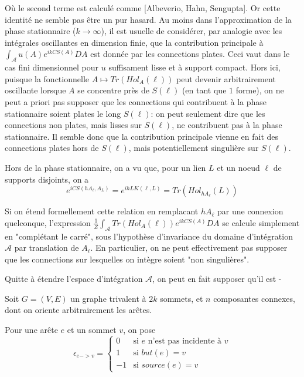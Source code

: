 \documentclass[10pt]{article}
\begin{document}
Où le second terme est calculé comme [Albeverio, Hahn, Sengupta]. Or cette identité ne semble pas être un pur hasard. Au moins dans l'approximation de la phase stationnaire ($k\to \infty$), il est usuelle de considérer, par analogie avec les intégrales oscillantes en dimension finie,  que la contribution principale à $\int_{\mathcal{A}} u(A) e^{i k CS(A)} DA $ est donnée par les connections plates. Ceci vaut dans le cas fini dimensionnel pour $u$ suffisament lisse et à support compact. Hors ici, puisque la fonctionnelle $A\mapsto Tr(Hol_A(\ell))$ peut devenir arbitrairement oscillante lorsque $A$ se concentre près de $S(\ell)$ (en tant que $1$ forme), on ne peut a priori pas supposer que les connections qui contribuent à la phase stationnaire soient plates le long $S(\ell)$: on peut seulement dire que les connections non plates, mais lisses sur $S(\ell)$, ne contribuent pas à la phase stationnaire. Il semble donc que la contribution principale vienne en fait des connections plates hors de $S(\ell)$, mais potentiellement singulière sur $S(\ell)$.

Hors de la phase stationnaire, on a vu que, pour un lien $L$ et un noeud $\ell$ de supports disjoints, on a
\[e^{i CS(h A_\ell,A_{L}) }=e^{ih LK(\ell,L)}=Tr(Hol_{h A_\ell}(L))\]

Si on étend formellement cette relation en remplacant $h A_\ell$ par une connexion quelconque, l'expression $\frac{1}{Z}\int_{\mathcal{A}} Tr(Hol_A(\ell)) e^{i k CS(A)} DA$ se calcule simplement en "complétant le carré", sous l'hypothèse d'invariance du domaine d'intégration $\mathcal{A}$ par translation de $A_\ell$. En particulier, on ne peut effectivement pas supposer que les connections sur lesquelles on intègre soient "non singulières".

Quitte à étendre l'espace d'intégration $\mathcal{A}$, on peut en fait supposer qu'il est -


\newpage


Soit $G=(V,E)$ un graphe trivalent à $2k$ sommets, et $n$ composantes connexes, dont on oriente arbitrairement les arêtes.

Pour une arête $e$ et un sommet $v$, on pose
\[
  \epsilon_{e->v}=
  \left\{
    \begin{array}{ll}
      0 & \mbox{si } e \mbox{ n'est pas incidente à }v\\
      1 & \mbox{si } but(e)=v\\
      -1 & \mbox{si } source(e)=v
    \end{array}
  \right.
\]
\end{document}
